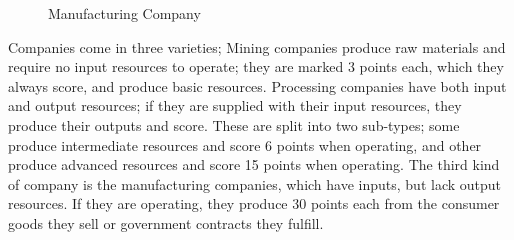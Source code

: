 \documentclass[]{article}
\begin{document}
\begin{figure}[h]
\begin{minipage}{.3\textwidth}
  Manufacturing Company
\end{minipage}
\end{figure}
Companies come in three varieties; Mining companies produce raw materials and
require no input resources to operate; they are marked 3 points each, which they
always score, and produce basic resources. Processing companies have both input
and output resources; if they are supplied with their input resources, they
produce their outputs and score. These are split into two sub-types; some
produce intermediate resources and score 6 points when operating, and other
produce advanced resources and score 15 points when operating. The third kind of
company is the manufacturing companies, which have inputs, but lack output
resources. If they are operating, they produce 30 points each from the consumer
goods they sell or government contracts they fulfill.
\end{document}
